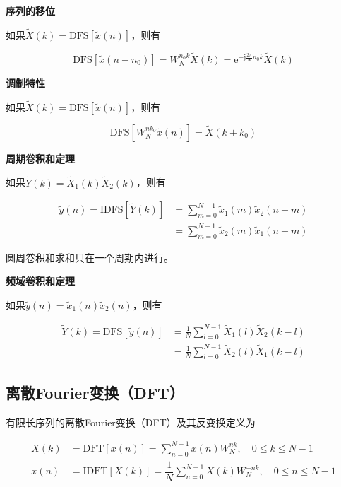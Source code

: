 \documentclass[cn, hazy, blue, normal, 14pt]{elegantnote}
\begin{document}
\textbf{序列的移位}

如果$\widetilde{X}(k)=\text{DFS}[\widetilde{x}(n)]$，则有

\begin{equation}
    \text{DFS}[\widetilde{x}(n-n_0)]=W_N^{n_0 k}\widetilde{X}(k)=\text{e}^{-\text{j}\frac{2\pi}{N}n_0 k}\widetilde{X}(k)
\end{equation}

\textbf{调制特性}

如果$\widetilde{X}(k)=\text{DFS}[\widetilde{x}(n)]$，则有

\begin{equation}
    \text{DFS}[W_N^{nk_0}\widetilde{x}(n)]=\widetilde{X}(k+k_0)
\end{equation}

\textbf{周期卷积和定理}

如果$\widetilde{Y}(k)=\widetilde{X}_1(k)\widetilde{X}_2(k)$，则有

\begin{equation}
\begin{aligned}
    \widetilde{y}(n)=\text{IDFS}[\widetilde{Y}(k)]&=\sum_{m=0}^{N-1}{\widetilde{x}_1(m)\widetilde{x}_2(n-m)} \\
    &=\sum_{m=0}^{N-1}{\widetilde{x}_2(m)\widetilde{x}_1(n-m)}
\end{aligned}
\end{equation}

圆周卷积和求和只在一个周期内进行。

\textbf{频域卷积和定理}

如果$\widetilde{y}(n)=\widetilde{x}_1(n)\widetilde{x}_2(n)$，则有

\begin{equation}
\begin{aligned}
    \widetilde{Y}(k)=\text{DFS}[\widetilde{y}(n)]&=\frac{1}{N}\sum_{l=0}^{N-1}{\widetilde{X}_1(l)\widetilde{X}_2(k-l)} \\
    &=\frac{1}{N}\sum_{l=0}^{N-1}{\widetilde{X}_2(l)\widetilde{X}_1(k-l)}
\end{aligned}
\end{equation}

\subsection{离散Fourier变换（DFT）}

有限长序列的离散Fourier变换（DFT）及其反变换定义为

\begin{equation}
\begin{aligned}
    {X}(k)&=\text{DFT}[{x}(n)]=\sum_{n=0}^{N-1}{{x}(n)W_{N}^{nk}}, \quad 0\leq k \leq N-1 \\
    {x}(n)&=\text{IDFT}[{X}(k)]=\dfrac{1}{N}\sum_{n=0}^{N-1}{{X}(k)W_{N}^{-nk}}, \quad 0\leq n \leq N-1
\end{aligned}
\end{equation}
\end{document}
